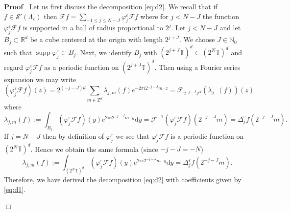 \documentclass[a4paper,11pt]{article}
\newcommand{\assign}{:=}
\newcommand{\cdummy}{\cdot}
\newcommand{\mathd}{\mathrm{d}}
\newcommand{\tmop}[1]{\ensuremath{\operatorname{#1}}}
\newenvironment{proof}{\noindent\textbf{Proof\ }}{\hspace*{\fill}$\Box$\medskip}
\numberwithin{equation}{section}
\begin{document}
  
 \begin{proof} 
  Let us first discuss the decomposition {\eqref{eq:d2}}. We recall that if $f
  \in \mathcal{S}' (\Lambda_{\varepsilon})$ then $\mathcal{F} f = \sum_{- 1
  \leqslant j \leqslant N - J} \varphi^{\varepsilon}_j \mathcal{F} f$ where
  for $j < N - J$ the function $\varphi^{\varepsilon}_j \mathcal{F} f$ is
  supported in a ball of radius proportional to $2^j$. Let $j < N - J$ and let
  $B_j \subset \mathbb{R}^d$ be a cube centered at the origin with length
  $2^{j + J}$. We choose $J \in \mathbb{N}_0$ such that $\tmop{supp}
  \varphi^{\varepsilon}_j \subset B_j$. Next, we identify $B_j$ with $(2^{j +
  J} \mathbb{T})^d \subset (2^N \mathbb{T})^d$ and regard
  $\varphi^{\varepsilon}_j \mathcal{F} f$ as a periodic function on $(2^{j +
  J} \mathbb{T})^d$. Then using a Fourier series expansion we may write
  \[ (\varphi^{\varepsilon}_j \mathcal{F} f) (z) = 2^{(- j - J) d} \sum_{m
     \in \mathbb{Z}^d} \lambda_{j, m} (f) e^{- 2 \pi i 2^{- j - J} m \cdummy
     z} = \mathcal{F}_{2^{- j - J} \mathbb{Z}^d} (\lambda_{j, \cdot} (f)) (z) \]
  where
  \[ \lambda_{j, m} (f) \assign \int_{B_j} (\varphi^{\varepsilon}_j
     \mathcal{F} f) (y) e^{2 \pi i 2^{- j - J} m \cdummy y} \mathd y =
     \mathcal{F}^{- 1} (\varphi^{\varepsilon}_j \mathcal{F} f) (2^{- j - J} m)
     = \Delta_j^{\varepsilon} f (2^{- j - J} m) . \]
  If $j = N - J$ then by definition of $\varphi^{\varepsilon}_j$ we see that
  $\varphi^{\varepsilon}_j \mathcal{F} f$ is a periodic function on $(2^N
  \mathbb{T})^d$. Hence we obtain the same formula (since $- j - J = - N$)
  \[ \lambda_{j, m} (f) \assign \int_{(2^N \mathbb{T})^d}
     (\varphi^{\varepsilon}_j \mathcal{F} f) (y) e^{2 \pi i 2^{- j - J} m
     \cdummy y} \mathd y = \Delta_j^{\varepsilon} f (2^{- j - J} m) . \]
  Therefore, we have derived the decomposition {\eqref{eq:d2}} with
  coefficients given by {\eqref{eq:d1}}.
  

\end{proof}
\end{document}
